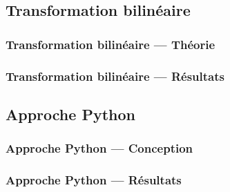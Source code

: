 \subsection{Transformation bilinéaire}

\begin{frame}
\frametitle{Transformation bilinéaire — Théorie}
\todo{}
\end{frame}

\begin{frame}
\frametitle{Transformation bilinéaire — Résultats}
\todo{}
\end{frame}

\subsection{Approche Python}

\begin{frame}
\frametitle{Approche Python — Conception}
\todo{}
\end{frame}

\begin{frame}
\frametitle{Approche Python — Résultats}
\todo{}
\end{frame}

